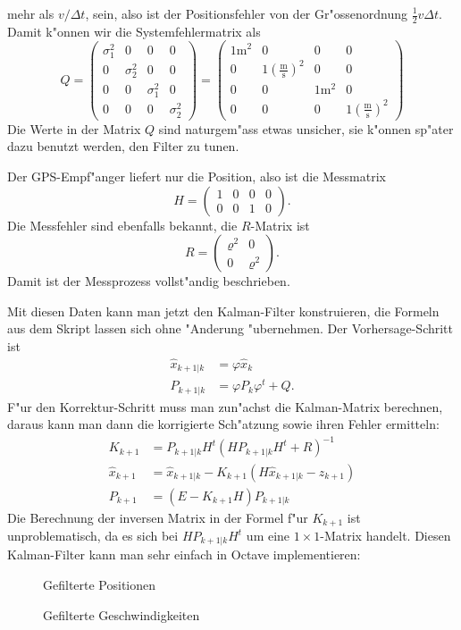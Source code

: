 \begin{loesung}
mehr als $v/\Delta t$, sein, also ist der Positionsfehler von der
Gr"ossenordnung $\frac12v \Delta t$. Damit k"onnen wir die Systemfehlermatrix
als
\[
Q=
\begin{pmatrix}
\sigma_1^2&0&0&0\\
0&\sigma_2^2&0&0\\
0&0&\sigma_1^2&0\\
0&0&0&\sigma_2^2
\end{pmatrix}
=
\begin{pmatrix}
1\text{m}^2&0&0&0\\
0&1\left(\frac{\text{m}}{\text{s}}\right)^2&0&0\\
0&0&1\text{m}^2&0\\
0&0&0&1\left(\frac{\text{m}}{\text{s}}\right)^2
\end{pmatrix}
\]
Die Werte in der Matrix $Q$ sind naturgem"ass etwas unsicher, sie k"onnen
sp"ater dazu benutzt werden, den Filter zu tunen.

Der GPS-Empf"anger liefert nur die Position, also ist die Messmatrix
\[
H=
\begin{pmatrix}
1&0&0&0\\
0&0&1&0
\end{pmatrix}.
\]
Die Messfehler sind ebenfalls bekannt, die $R$-Matrix ist
\[
R=\begin{pmatrix}
\varrho^2&0\\
0&\varrho^2
\end{pmatrix}.
\]
Damit ist der Messprozess vollst"andig beschrieben.

Mit diesen Daten kann man jetzt den Kalman-Filter konstruieren, die
Formeln aus dem Skript lassen sich ohne "Anderung "ubernehmen.
Der Vorhersage-Schritt ist
\begin{align*}
\hat x_{k+1|k}&=\varphi \hat x_k
\\
P_{k+1|k}&=\varphi P_k\varphi^t+Q.
\end{align*}
F"ur den Korrektur-Schritt muss man zun"achst die Kalman-Matrix 
berechnen, daraus kann man dann die korrigierte Sch"atzung sowie
ihren Fehler ermitteln:
\begin{align*}
K_{k+1}&=P_{k+1|k}H^t(HP_{k+1|k}H^t+R)^{-1}
\\
\hat x_{k+1}&=
\hat x_{k+1|k} - K_{k+1}(H\hat x_{k+1|k}-z_{k+1})
\\
P_{k+1}&=(E-K_{k+1}H)P_{k+1|k}
\end{align*}
Die Berechnung der inversen Matrix in der Formel f"ur $K_{k+1}$ ist
unproblematisch, da es sich bei $HP_{k+1|k}H^t$ um eine $1\times 1$-Matrix
handelt.
Diesen Kalman-Filter kann man sehr einfach in Octave implementieren:
{\small
{}
}
\begin{figure}
\caption{Gefilterte Positionen}
\end{figure}
\begin{figure}
\caption{Gefilterte Geschwindigkeiten}
\end{figure}
\end{loesung}


